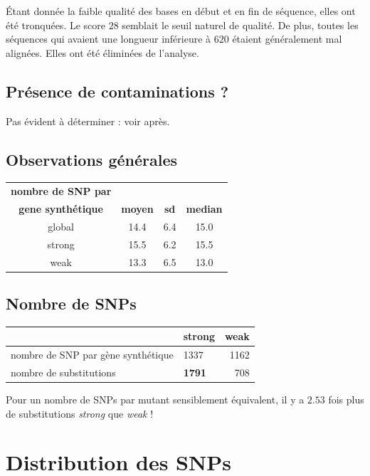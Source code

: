 \documentclass[a4paper]{tufte-handout}
\begin{document}
Étant donnée la faible qualité des bases en début et en fin de séquence, elles
ont été tronquées. Le score \(28\) semblait le seuil naturel de qualité. De plus,
toutes les séquences qui avaient une longueur inférieure à \(620\) étaient
généralement mal alignées. Elles ont été éliminées de l'analyse. 

\subsection{Présence de contaminations ?}
\label{sec:orgheadline2}
Pas évident à déterminer : voir après. 
\subsection{Observations générales}
\label{sec:orgheadline3}

\begin{center}
\begin{tabular}{cccc}
\toprule
\textbf{nombre de SNP par} &  &  & \\
\textbf{gene synthétique} & \textbf{moyen} & \textbf{sd} & \textbf{median}\\
\midrule
global & 14.4 & 6.4 & 15.0\\
strong & 15.5 & 6.2 & 15.5\\
weak & 13.3 & 6.5 & 13.0\\
\bottomrule
\end{tabular}
\end{center}

\subsection{Nombre de SNPs}
\label{sec:orgheadline4}

\begin{center}
\begin{tabular}{llr}
\toprule
 & \textbf{strong} & \textbf{weak}\\
\midrule
nombre de SNP par gène synthétique & 1337 & 1162\\
nombre de substitutions & \textbf{1791} & 708\\
\bottomrule
\end{tabular}
\end{center}

Pour un nombre de SNPs par mutant sensiblement équivalent, il y a \(2.53\) fois
plus de substitutions \emph{strong} que \emph{weak} !

\newpage
\section{Distribution des SNPs}
\label{sec:orgheadline8}
\end{document}
